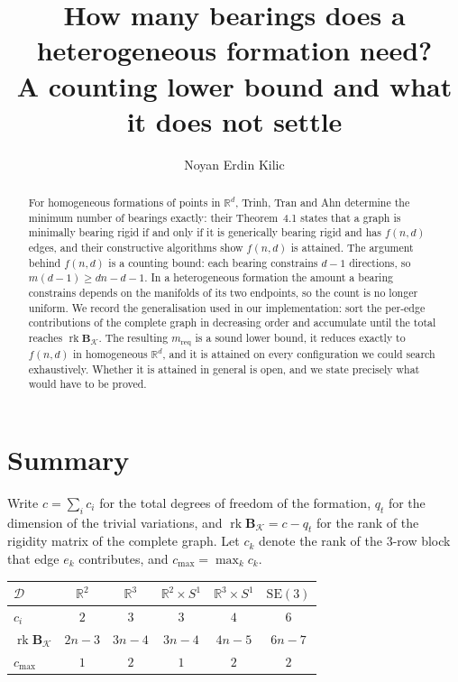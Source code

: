 \documentclass[11pt,a4paper]{article}
\title{\bf How many bearings does a heterogeneous formation need?\\
       A counting lower bound and what it does not settle}
\author{Noyan Erdin Kilic}
\date{}
\theoremstyle{plain}
\theoremstyle{definition}
\newcommand{\R}{\mathbb{R}}
\newcommand{\SEthree}{\mathrm{SE}(3)}
\newcommand{\rank}{\operatorname{rk}}
\begin{document}
\maketitle

\begin{abstract}
For homogeneous formations of points in $\R^d$, Trinh, Tran and Ahn
\cite{trinh2020} determine the minimum number of bearings exactly: their
Theorem~4.1 states that a graph is minimally bearing rigid if and only if it is
generically bearing rigid and has $f(n,d)$ edges, and their constructive
algorithms show $f(n,d)$ is attained. The argument behind $f(n,d)$ is a counting
bound: each bearing constrains $d-1$ directions, so $m(d-1)\ge dn-d-1$. In a
heterogeneous formation the amount a bearing constrains depends on the manifolds
of its two endpoints, so the count is no longer uniform. We record the
generalisation used in our implementation: sort the per-edge contributions of
the complete graph in decreasing order and accumulate until the total reaches
$\rank\mathbf B_{\mathcal K}$. The resulting $m_{\text{req}}$ is a sound lower
bound, it reduces exactly to $f(n,d)$ in homogeneous $\R^d$, and it is attained
on every configuration we could search exhaustively. Whether it is attained in
general is open, and we state precisely what would have to be proved.
\end{abstract}

\section{Summary}

Write $c=\sum_i c_i$ for the total degrees of freedom of the formation, $q_t$
for the dimension of the trivial variations, and
$\rank\mathbf B_{\mathcal K}=c-q_t$ for the rank of the rigidity matrix of the
complete graph. Let $c_k$ denote the rank of the $3$-row block that edge $e_k$
contributes, and $c_{\max}=\max_k c_k$.

\begin{center}
\begin{tabular}{lccccc}
\toprule
$\mathcal D$ & $\R^2$ & $\R^3$ & $\R^2\times S^1$ & $\R^3\times S^1$ & $\SEthree$\\
\midrule
$c_i$                          & $2$ & $3$ & $3$ & $4$ & $6$\\
$\rank\mathbf B_{\mathcal K}$  & $2n-3$ & $3n-4$ & $3n-4$ & $4n-5$ & $6n-7$\\
$c_{\max}$                     & $1$ & $2$ & $1$ & $2$ & $2$\\
\bottomrule
\end{tabular}
\end{center}
\end{document}
